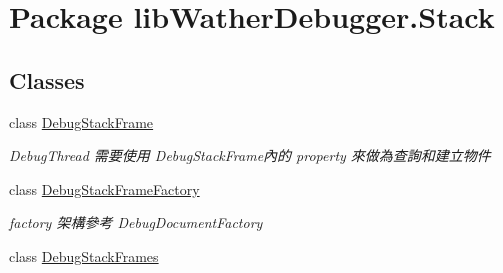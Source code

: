 \hypertarget{namespacelib_wather_debugger_1_1_stack}{\section{Package lib\+Wather\+Debugger.\+Stack}
\label{namespacelib_wather_debugger_1_1_stack}
}
\subsection*{Classes}
\begin{DoxyCompactItemize}
\item 
class \hyperlink{classlib_wather_debugger_1_1_stack_1_1_debug_stack_frame}{Debug\+Stack\+Frame}
\begin{DoxyCompactList}\small\item\em Debug\+Thread 需要使用 Debug\+Stack\+Frame內的 property 來做為查詢和建立物件 \end{DoxyCompactList}\item 
class \hyperlink{classlib_wather_debugger_1_1_stack_1_1_debug_stack_frame_factory}{Debug\+Stack\+Frame\+Factory}
\begin{DoxyCompactList}\small\item\em factory 架構參考 Debug\+Document\+Factory \end{DoxyCompactList}\item 
class \hyperlink{classlib_wather_debugger_1_1_stack_1_1_debug_stack_frames}{Debug\+Stack\+Frames}
\end{DoxyCompactItemize}
